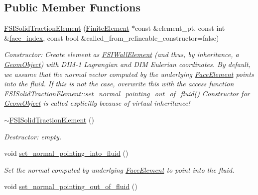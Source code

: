 \subsection*{Public Member Functions}
\begin{DoxyCompactItemize}
\item 
\hyperlink{classoomph_1_1FSISolidTractionElement_a6b1f461ae72d6ecbd9e1b1175ee9da5d}{F\+S\+I\+Solid\+Traction\+Element} (\hyperlink{classoomph_1_1FiniteElement}{Finite\+Element} $\ast$const \&element\+\_\+pt, const int \&\hyperlink{classoomph_1_1FaceElement_a478d577ac6db67ecc80f1f02ae3ab170}{face\+\_\+index}, const bool \&called\+\_\+from\+\_\+refineable\+\_\+constructor=false)
\begin{DoxyCompactList}\small\item\em Constructor\+: Create element as \hyperlink{classoomph_1_1FSIWallElement}{F\+S\+I\+Wall\+Element} (and thus, by inheritance, a \hyperlink{classoomph_1_1GeomObject}{Geom\+Object}) with D\+I\+M-\/1 Lagrangian and D\+IM Eulerian coordinates. By default, we assume that the normal vector computed by the underlying \hyperlink{classoomph_1_1FaceElement}{Face\+Element} points into the fluid. If this is not the case, overwrite this with the access function \hyperlink{classoomph_1_1FSISolidTractionElement_aaa745c32fe53e76ac0b9d1b00a05fe36}{F\+S\+I\+Solid\+Traction\+Element\+::set\+\_\+normal\+\_\+pointing\+\_\+out\+\_\+of\+\_\+fluid()} Constructor for \hyperlink{classoomph_1_1GeomObject}{Geom\+Object} is called explicitly because of virtual inheritance! \end{DoxyCompactList}\item 
\hyperlink{classoomph_1_1FSISolidTractionElement_a6f5c381525601f876ba1bcd6b754b3f3}{$\sim$\+F\+S\+I\+Solid\+Traction\+Element} ()
\begin{DoxyCompactList}\small\item\em Destructor\+: empty. \end{DoxyCompactList}\item 
void \hyperlink{classoomph_1_1FSISolidTractionElement_a0addf60f42d1386b6b07f52f62a8373b}{set\+\_\+normal\+\_\+pointing\+\_\+into\+\_\+fluid} ()
\begin{DoxyCompactList}\small\item\em Set the normal computed by underlying \hyperlink{classoomph_1_1FaceElement}{Face\+Element} to point into the fluid. \end{DoxyCompactList}\item 
void \hyperlink{classoomph_1_1FSISolidTractionElement_aaa745c32fe53e76ac0b9d1b00a05fe36}{set\+\_\+normal\+\_\+pointing\+\_\+out\+\_\+of\+\_\+fluid} ()

\end{DoxyCompactItemize}
